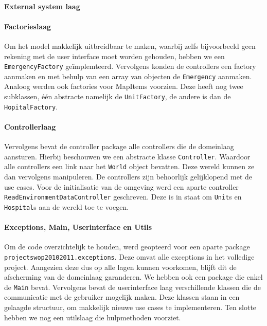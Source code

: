 \paragraph{External system laag}
\paragraph{Factorieslaag}
Om het model makkelijk uitbreidbaar te maken, waarbij zelfs bijvoorbeeld geen rekening met de user interface moet worden gehouden, hebben we een \texttt{EmergencyFactory} ge\"implemteerd. Vervolgens konden de controllers een factory aanmaken en met behulp van een array van objecten de \texttt{Emergency} aanmaken. Analoog werden ook factories voor MapItems voorzien. Deze heeft nog twee subklassen, \'e\'en abstracte namelijk de \texttt{UnitFactory}, de andere is dan de \texttt{HopitalFactory}. 
\paragraph{Controllerlaag}
Vervolgens bevat de controller package alle controllers die de domeinlaag aansturen. Hierbij beschouwen we een abstracte klasse \texttt{Controller}. Waardoor alle controllers een link naar het \texttt{World} object bevatten. Deze wereld kunnen ze dan vervolgens manipuleren. De controllers zijn behoorlijk gelijklopend met de use cases. Voor de initialisatie van de omgeving werd een aparte controller \texttt{ReadEnvironmentDataController} geschreven. Deze is in staat om \texttt{Unit}s en \texttt{Hospital}s aan de wereld toe te voegen.
\paragraph{Exceptions, Main, Userinterface en Utils}
Om de code overzichtelijk te houden, werd geopteerd voor een aparte package \texttt{projectswop20102011.exceptions}. Deze omvat alle exceptions in het volledige project. Aangezien deze dus op alle lagen kunnen voorkomen, blijft dit de afscherming van de domeinlaag garanderen. We hebben ook een package die enkel de \texttt{Main} bevat. Vervolgens bevat de userinterface laag verschillende klassen die de communicatie met de gebruiker mogelijk maken. Deze klassen staan in een gelaagde structuur, om makkelijk nieuwe use cases te implementeren. Ten slotte hebben we nog een utilslaag die hulpmethoden voorziet.